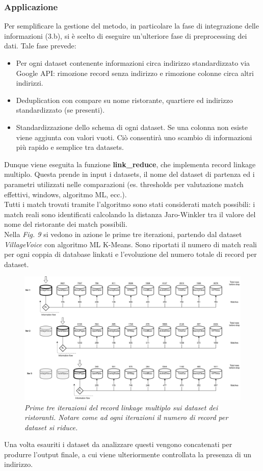 \documentclass[a4paper,12pt]{article}
\begin{document}
\subsubsection*{Applicazione}
Per semplificare la gestione del metodo, in particolare la fase di integrazione delle informazioni (3.b), si è scelto di eseguire un'ulteriore fase di preprocessing dei dati. Tale fase prevede:
\begin{itemize}
	\item Per ogni dataset contenente informazioni circa indirizzo standardizzato via Google API: rimozione record senza indirizzo e rimozione colonne circa altri indirizzi.
	\item Deduplication con compare su nome ristorante, quartiere ed indirizzo standardizzato (se presenti).
	\item Standardizzazione dello schema di ogni dataset. Se una colonna non esiste viene aggiunta con valori vuoti. Ciò consentirà uno scambio di informazioni più rapido e semplice tra datasets.
\end{itemize}
Dunque viene eseguita la funzione \textbf{link\_reduce}, che implementa record linkage multiplo. Questa prende in input i datasets, il nome del dataset di partenza ed i parametri utilizzati nelle comparazioni (es. thresholds per valutazione match effettivi, windows, algoritmo ML, ecc.).\\
Tutti i match trovati tramite l'algoritmo sono stati considerati match possibili: i match reali sono identificati calcolando la distanza Jaro-Winkler tra il valore del nome del ristorante dei match possibili.\\
Nella \textit{Fig. 9} si vedono in azione le prime tre iterazioni, partendo dal dataset \textit{VillageVoice} con algoritmo ML K-Means. Sono riportati il numero di match reali per ogni coppia di database linkati e l'evoluzione del numero totale di record per dataset.

\begin{figure}[H]
	\centering
	\includegraphics[width=0.8\linewidth]{img/Method2.png}
	\caption{\textit{Prime tre iterazioni del record linkage multiplo sui dataset dei ristoranti. Notare come ad ogni iterazioni il numero di record per dataset si riduce.}}
\end{figure}

\noindent Una volta esauriti i dataset da analizzare questi vengono concatenati per produrre l'output finale, a cui viene ulteriormente controllata la presenza di un indirizzo.

\newpage
\printbibliography[title=Bibliografia]
\end{document}
